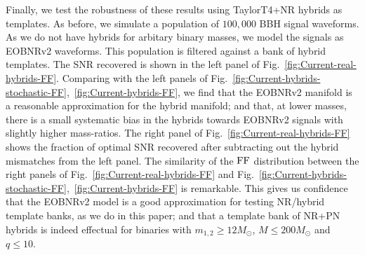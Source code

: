 Finally, we test the robustness of these results using TaylorT4+NR hybrids 
as templates. As before, we simulate a population of $100,000$ BBH signal 
waveforms. As we do not have hybrids for arbitary binary
masses, we model the signals as EOBNRv2 waveforms. This population is filtered
against a bank of hybrid templates. The SNR recovered is shown in the left 
panel of Fig.~\ref{fig:Current-real-hybrids-FF}. Comparing with the left panels 
of Fig.~\ref{fig:Current-hybrids-stochastic-FF},~\ref{fig:Current-hybrids-FF}, 
we find that the EOBNRv2 manifold is a reasonable approximation for the hybrid 
manifold; and that, at lower masses, there is a small systematic bias in the 
hybrids towards EOBNRv2 signals with slightly higher mass-ratios.
The right panel of Fig.~\ref{fig:Current-real-hybrids-FF} 
shows the fraction of optimal SNR recovered after subtracting out the hybrid
mismatches from the left panel. The similarity of the $\mathrm{FF}$ distribution between 
the right panels of Fig.~\ref{fig:Current-real-hybrids-FF} and 
Fig.~\ref{fig:Current-hybrids-stochastic-FF},~\ref{fig:Current-hybrids-FF}
is remarkable. This gives us confidence that the EOBNRv2 model is a good 
approximation for testing NR/hybrid template banks, as we do in this paper; 
and that a template bank of NR+PN hybrids is indeed effectual for binaries 
with $m_{1,2}\geq 12M_\odot$, $M\leq 200M_\odot$ and $q\leq 10$.


